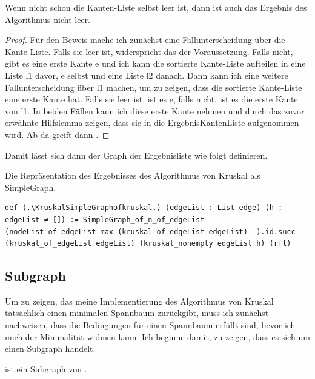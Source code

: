 \begin{lemma}[\Kruskalkruskalnonempty]
  Wenn nicht schon die Kanten-Liste selbst leer ist, dann ist auch das Ergebnis des Algorithmus nicht leer.
\end{lemma}
\begin{proof}
  Für den Beweis mache ich zunächst eine Fallunterscheidung über die Kante-Liste.
  Falls sie leer ist, widerspricht das der Voraussetzung.
  Falls nicht, gibt es eine erste Kante e und ich kann die sortierte Kante-Liste aufteilen in eine Liste l1 davor, e selbst und eine Liste l2 danach.
  Dann kann ich eine weitere Fallunterscheidung über l1 machen, um zu zeigen, dass die sortierte Kante-Liste eine erste Kante hat.
  Falls sie leer ist, ist es e, falls nicht, ist es die erste Kante von l1.
  In beiden Fällen kann ich diese erste Kante nehmen und durch das zuvor erwähnte Hilfslemma zeigen, dass sie in die ErgebnisKantenListe aufgenommen wird.
  Ab da greift dann \Kruskalkruskalhelpernonempty.
\end{proof}

Damit lässt sich dann der Graph der Ergebnisliste wie folgt definieren.

\begin{definition}[\KruskalSimpleGraphofkruskal]
  Die Repräsentation des Ergebnisses des Algorithmus von Kruskal als SimpleGraph.
\end{definition}
\begin{lstlisting}
def (.\KruskalSimpleGraphofkruskal.) (edgeList : List edge) (h : edgeList ≠ []) := SimpleGraph_of_n_of_edgeList (nodeList_of_edgeList_max (kruskal_of_edgeList edgeList) _).id.succ (kruskal_of_edgeList edgeList) (kruskal_nonempty edgeList h) (rfl)
\end{lstlisting}

\subsection{Subgraph}

Um zu zeigen, das meine Implementierung des Algorithmus von Kruskal tatsächlich einen minimalen Spannbaum zurückgibt, muss ich zunächst nachweisen,
dass die Bedingungen für einen Spannbaum erfüllt sind, bevor ich mich der Minimalität widmen kann.
Ich beginne damit, zu zeigen, dass es sich um einen Subgraph handelt.

\begin{theorem}
  \KruskalSimpleGraphofkruskal ist ein Subgraph von \KruskalSimpleGraphofnofedgeList.
\end{theorem}

